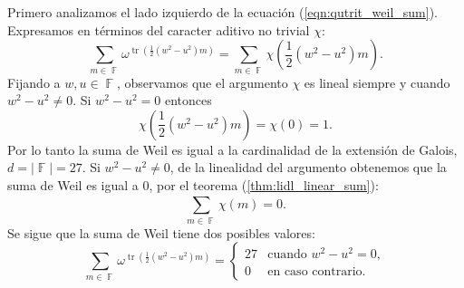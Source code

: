 \documentclass[a4paper, 11pt]{article}
\DeclareMathOperator{\F}{\mathbb{F}}
\DeclareMathOperator{\tr}{tr}
\begin{document}
  Primero analizamos el lado izquierdo de la ecuación
  (\ref{eqn:qutrit_weil_sum}). Expresamos en términos del
  caracter aditivo no trivial $\chi$:
  \begin{equation}
    \sum_{m \in \F}^{} \omega^{\tr\left( \frac{1}{2} \left(
    w^2-u^2\right) m \right) }
    = \sum_{m \in \F}^{} \chi\left( \frac{1}{2} \left(
    w^2-u^2 \right) m \right).
  \end{equation}
  Fijando a $w, u \in \F$, observamos que el argumento
  $\chi$ es lineal siempre y cuando $w^2-u^2 \neq 0$. Si
  $w^2-u^2 = 0$ entonces
  \begin{equation}
    \chi\left( \frac{1}{2} \left(w^2-u^2\right) m \right) 
    = \chi(0)
    = 1.
  \end{equation}
  Por lo tanto la suma de Weil es igual a la cardinalidad de
  la extensión de Galois, $d = |\F| = 27$. Si $w^2-u^2 \neq
  0$, de la linealidad del argumento obtenemos que la suma
  de Weil es igual a 0, por el teorema
  (\ref{thm:lidl_linear_sum}):
  \begin{equation}
    \sum_{m \in \F}^{} \chi(m) = 0.
  \end{equation}
  Se sigue que la suma de Weil tiene dos posibles valores:
  \begin{equation}
    \label{eqn:left_weil_sum}
    \sum_{m \in \F}^{} \omega^{\tr\left(
    \frac{1}{2}(w^2-u^2)m \right) }
    = 
    \begin{cases}
      27 & \text{cuando } w^2-u^2 = 0, \\
      0 & \text{en caso contrario}.
    \end{cases}
  \end{equation}
\end{document}
